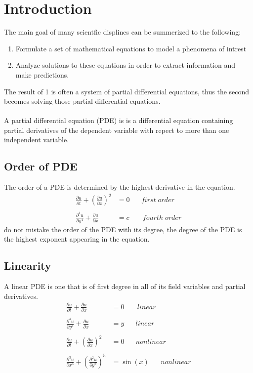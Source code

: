 \documentclass[]{article}
\begin{document}
\newpage

\tableofcontents

\newpage

\section{Introduction}
The main goal of many scientfic displines can be summerized to the following:

\begin{enumerate}
\item Formulate a set of mathematical equations to model a phenomena of intrest
\item Analyze solutions to these equations in order to extract information and make predictions.
\end{enumerate}

The result of 1 is often a system of partial differential equations, thus the second becomes solving those partial differential equations.
\\
\\
A partial differential equation (PDE) is is a differential equation containing partial derivatives of the dependent variable with repect to more than one independent variable.

\subsection*{Order of PDE}
The order of a PDE is determined by the highest derivative in the equation.
\begin{align*}
\frac{\partial u}{\partial t} + {(\frac{\partial u}{\partial x})}^2 &= 0 \;\;\;\;\;\; first \; order
\\
\\
\frac{\partial^4 u}{\partial y^4} + \frac{\partial u}{\partial x} &= c \;\;\;\;\;\;\; fourth \; order
\end{align*}
do not mistake the order of the PDE with its degree, the degree of the PDE is the highest exponent appearing in the equation.
\subsection*{Linearity} 
A linear PDE is one that is of first degree in all of its field variables and partial derivatives.
\begin{align*}
\frac{\partial u}{\partial t} + \frac{\partial u}{\partial x} &= 0 \;\;\;\;\;\;\ linear
\\
\\
\frac{\partial^4 u}{\partial y^4} + \frac{\partial u}{\partial x} &= y \;\;\;\;\;\; linear
\\
\\
\frac{\partial u}{\partial t} + {(\frac{\partial u}{\partial x})}^2 &= 0 \;\;\;\;\;\; nonlinear
\\
\\
\frac{\partial^3 u}{\partial x^3} + {(\frac{\partial^2 u}{\partial y^2})}^5 &= \sin(x) \;\;\;\;\;\; nonlinear
\end{align*}
\end{document}
